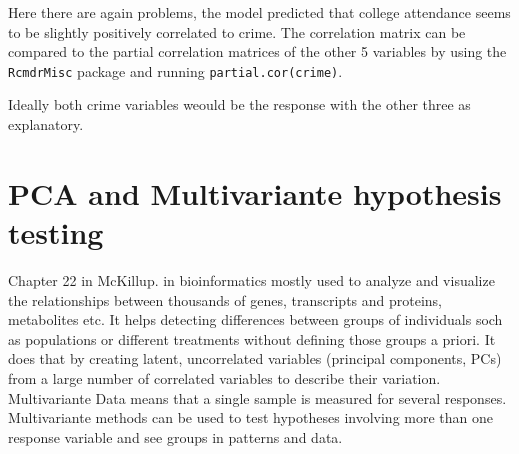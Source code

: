\documentclass{article}
\begin{document}
Here there are again problems, the model predicted that college attendance seems to be slightly positively correlated to crime.
The correlation matrix can be compared to the partial correlation matrices of the other 5 variables by using the \texttt{RcmdrMisc} package and running \texttt{partial.cor(crime)}.\par 
Ideally both crime variables weould be the response with the other three as explanatory.

\section{PCA and Multivariante hypothesis testing}
Chapter 22 in McKillup. in bioinformatics mostly used to analyze and visualize the relationships between thousands of genes, transcripts and proteins, metabolites etc. It helps detecting differences between groups of individuals soch as populations or different treatments without defining those groups a priori. It does that by creating latent, uncorrelated variables (principal components, PCs) from a large number of correlated variables to describe their variation. \\
Multivariante Data means that a single sample is measured for several responses. Multivariante methods can be used to test hypotheses involving more than one response variable and see groups in patterns and data.\par 
\end{document}
